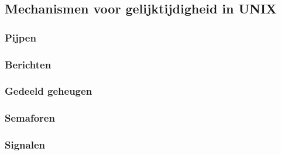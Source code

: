 \subsection{Mechanismen voor gelijktijdigheid in UNIX}

\subsubsection{Pijpen}

\subsubsection{Berichten}

\subsubsection{Gedeeld geheugen}

\subsubsection{Semaforen}

\subsubsection{Signalen}

\subsubsection{}

\subsubsubsection{}

\subsubsubsection{}

\subsubsubsection{}

\subsubsubsection{}

\subsubsubsection{}

\subsubsubsection{}

\section{}

\section{}